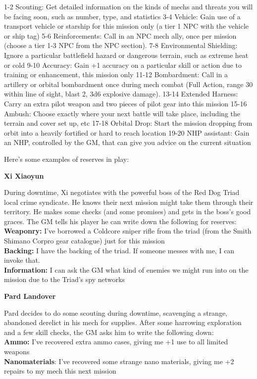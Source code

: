  1-2       Scouting: Get detailed information on the kinds of mechs and threats you will be
           facing soon, such as number, type, and statistics
 3-4       Vehicle: Gain use of a transport vehicle or starship for this mission only (a tier 1 NPC
           with the vehicle or ship tag)
 5-6       Reinforcements: Call in an NPC mech ally, once per mission (choose a tier 1-3 NPC
           from the NPC section).
 7-8       Environmental Shielding: Ignore a particular battlefield hazard or dangerous terrain,
           such as extreme heat or cold
 9-10      Accuracy: Gain +1 accuracy on a particular skill or action due to training or
           enhancement, this mission only
 11-12     Bombardment: Call in a artillery or orbital bombardment once during mech combat
           (Full Action, range 30 within line of sight, blast 2, 3d6 explosive damage).
 13-14     Extended Harness: Carry an extra pilot weapon and two pieces of pilot gear into this
           mission
 15-16     Ambush: Choose exactly where your next battle will take place, including the terrain
           and cover set up, etc
 17-18     Orbital Drop: Start the mission dropping from orbit into a heavily fortified or hard to
           reach location
 19-20     NHP assistant: Gain an NHP, controlled by the GM, that can give you advice on the
           current situation

Here’s some examples of reserves in play:

\textbf{Xi Xiaoyun}

During downtime, Xi negotiates with the powerful boss of the Red Dog Triad local crime syndicate. He knows their next mission might take them through their territory. He makes some checks (and some promises) and gets in the boss’s good graces. The GM tells his player he can write down the following for reserves:\\
\textbf{Weaponry:} I’ve borrowed a Coldcore sniper rifle from the triad (from the Smith Shimano Corpro gear catalogue) just for this mission\\
\textbf{Backing:} I have the backing of the triad. If someone messes with me, I can invoke that.\\
\textbf{Information:} I can ask the GM what kind of enemies we might run into on the mission due to the Triad’s spy networks

\textbf{Pard Landover}

Pard decides to do some scouting during downtime, scavenging a strange, abandoned derelict in his mech for supplies. After some harrowing exploration and a few skill checks, the GM asks him to write the following down:\\
\textbf{Ammo:} I’ve recovered extra ammo cases, giving me +1 use to all limited weapons\\
\textbf{Nanomaterials}: I’ve recovered some strange nano materials, giving me +2 repairs to my mech this next mission



